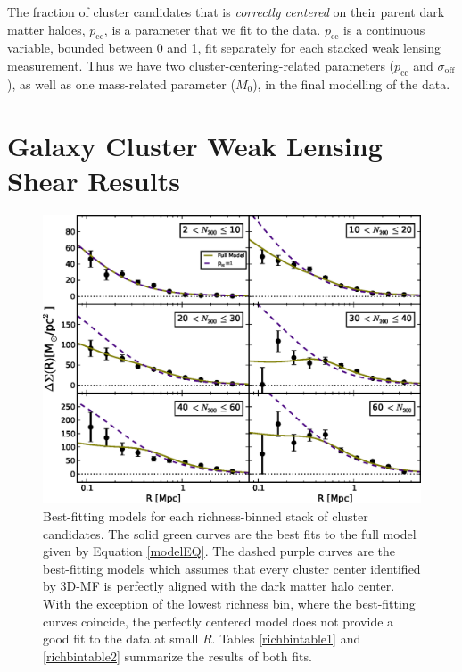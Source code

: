 The fraction of cluster candidates that is {\it correctly centered} on their parent dark matter haloes, $p_{\mathrm{cc}}$, is a parameter that we fit to the data. $p_{\mathrm{cc}}$ is a continuous variable, bounded between 0 and 1, fit separately for each stacked weak lensing measurement. Thus we have two cluster-centering-related parameters ($p_{\mathrm{cc}}$ and $\sigma_{\mathrm{off}}$), as well as one mass-related parameter ($M_0$), in the final modelling of the data.



\section{Galaxy Cluster Weak Lensing Shear Results}
\label{sec:results}

\begin{figure}
\begin{center}
  \includegraphics[scale=0.9]{plots_ch4/shearFit_panel_fcc0and1_slopeMN1p5_DuttonMaccio.eps}
  \caption[Shear for Richness-Binned Clusters]{Best-fitting models for each richness-binned stack of cluster candidates. The solid green curves are the best fits to the full model given by Equation \ref{modelEQ}. The dashed purple curves are the best-fitting models which assumes that every cluster center identified by \ac{3D-MF} is perfectly aligned with the dark matter halo center. With the exception of the lowest richness bin, where the best-fitting curves coincide, the perfectly centered model does not provide a good fit to the data at small $R$. Tables \ref{richbintable1} and \ref{richbintable2} summarize the results of both fits.}
\label{plot:nbinned}
\end{center}
\end{figure}

